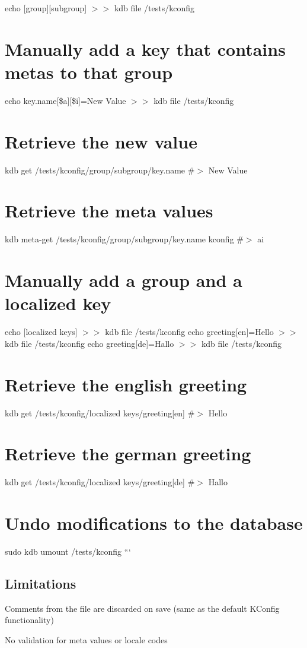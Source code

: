 echo \textquotesingle{}\mbox{[}group\mbox{]}\mbox{[}subgroup\mbox{]}\textquotesingle{} $>$$>$ {\ttfamily kdb file /tests/kconfig}\hypertarget{autotoc_md350_autotoc_md358}{}\section{Manually add a key that contains metas to that group}\label{autotoc_md350_autotoc_md358}
echo \textquotesingle{}key.\+name\mbox{[}\$a\mbox{]}\mbox{[}\$i\mbox{]}=New Value\textquotesingle{} $>$$>$ {\ttfamily kdb file /tests/kconfig}\hypertarget{autotoc_md350_autotoc_md359}{}\section{Retrieve the new value}\label{autotoc_md350_autotoc_md359}
kdb get /tests/kconfig/group/subgroup/key.name \#$>$ New Value\hypertarget{autotoc_md350_autotoc_md360}{}\section{Retrieve the meta values}\label{autotoc_md350_autotoc_md360}
kdb meta-\/get /tests/kconfig/group/subgroup/key.name kconfig \#$>$ ai\hypertarget{autotoc_md350_autotoc_md361}{}\section{Manually add a group and a localized key}\label{autotoc_md350_autotoc_md361}
echo \textquotesingle{}\mbox{[}localized keys\mbox{]}\textquotesingle{} $>$$>$ {\ttfamily kdb file /tests/kconfig} echo \textquotesingle{}greeting\mbox{[}en\mbox{]}=Hello\textquotesingle{} $>$$>$ {\ttfamily kdb file /tests/kconfig} echo \textquotesingle{}greeting\mbox{[}de\mbox{]}=Hallo\textquotesingle{} $>$$>$ {\ttfamily kdb file /tests/kconfig}\hypertarget{autotoc_md350_autotoc_md362}{}\section{Retrieve the english greeting}\label{autotoc_md350_autotoc_md362}
kdb get \textquotesingle{}/tests/kconfig/localized keys/greeting\mbox{[}en\mbox{]}\textquotesingle{} \#$>$ Hello\hypertarget{autotoc_md350_autotoc_md363}{}\section{Retrieve the german greeting}\label{autotoc_md350_autotoc_md363}
kdb get \textquotesingle{}/tests/kconfig/localized keys/greeting\mbox{[}de\mbox{]}\textquotesingle{} \#$>$ Hallo\hypertarget{autotoc_md350_autotoc_md364}{}\section{Undo modifications to the database}\label{autotoc_md350_autotoc_md364}
sudo kdb umount /tests/kconfig ```\hypertarget{autotoc_md350_autotoc_md365}{}\subsection{Limitations}\label{autotoc_md350_autotoc_md365}

\begin{DoxyItemize}
\item Comments from the file are discarded on save (same as the default K\+Config functionality)
\item No validation for meta values or locale codes 
\end{DoxyItemize}